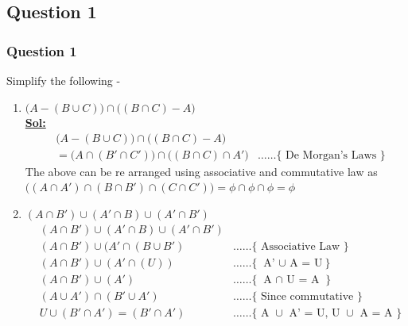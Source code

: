 \documentclass[xcolor=svgnames]{beamer}
\begin{document}
\subsection{Question 1}
\begin{frame}
\frametitle{Question 1}

Simplify the following - 
\begin{enumerate}
    \item $\big(A - (B \cup C)\big) \cap \big((B \cap C) - A\big)$
    \\ \textbf{\underline{Sol:}} 
    \begin{align*}
        & \big(A - (B \cup C)\big) \cap \big((B \cap C) - A\big)
        \\ &= \big(A \cap (B' \cap C')\big) \cap \big((B \cap C) \cap A'\big) & \ldots \ldots \{\text{ De Morgan's Laws }\}
    \end{align*}
    The above can be re arranged  using associative and commutative law as $ \big((A \cap A') \cap (B \cap B') \cap (C \cap C')\big)=  \phi \cap \phi \cap \phi = \phi$
    \item $(A \cap B') \cup (A' \cap B) \cup (A' \cap B')$
    \begin{align*}
        & (A \cap B') \cup (A' \cap B) \cup (A' \cap B')
        \\ & (A \cap B') \cup (A' \cap (B \cup B') & \ldots \ldots \{\text{ Associative Law }\}
        \\ & (A \cap B') \cup (A' \cap (U)) & \ldots \ldots \{\text{ A' $\cup$ A = U}\}
        \\ & (A \cap B') \cup (A') & \ldots \ldots \{\text{ A $\cap$ U = A }\}    
        \\ & (A \cup A') \cap (B' \cup  A') & \ldots \ldots \{\text{ Since commutative }\}        
        \\ & U \cup (B' \cap  A') = (B' \cap A') & \ldots \ldots \{\text{ A $\cup$ A' = U, U $\cup$ A = A }\}
    \end{align*}    
\end{enumerate}
\end{frame}
\end{document}
